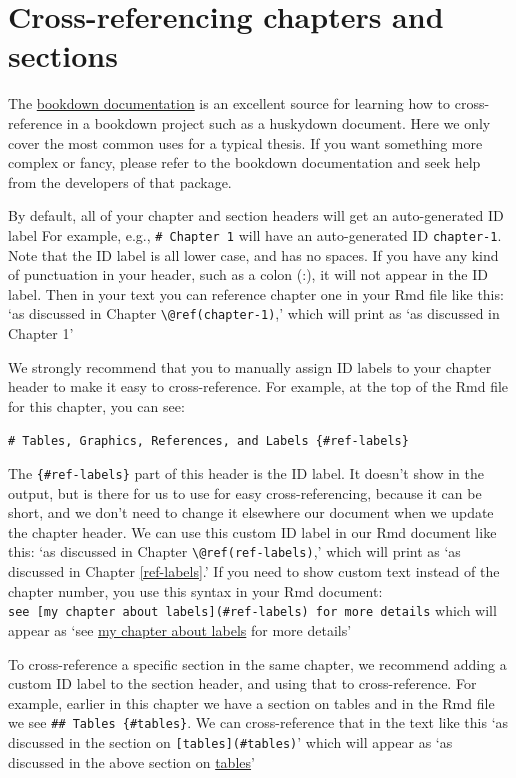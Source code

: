 \documentclass[print]{nuthesis}
\begin{document}
\hypertarget{cross-referencing-chapters-and-sections}{%
\section{Cross-referencing chapters and sections}\label{cross-referencing-chapters-and-sections}}

The \href{https://bookdown.org/yihui/bookdown/cross-references.html}{bookdown documentation} is an excellent source for learning how to cross-reference in a bookdown project such as a huskydown document. Here we only cover the most common uses for a typical thesis. If you want something more complex or fancy, please refer to the bookdown documentation and seek help from the developers of that package.

By default, all of your chapter and section headers will get an auto-generated ID label For example, e.g., \texttt{\#\ Chapter\ 1} will have an auto-generated ID \texttt{chapter-1}. Note that the ID label is all lower case, and has no spaces. If you have any kind of punctuation in your header, such as a colon (:), it will not appear in the ID label. Then in your text you can reference chapter one in your Rmd file like this: `as discussed in Chapter \texttt{\textbackslash{}@ref(chapter-1)},' which will print as `as discussed in Chapter 1'

We strongly recommend that you to manually assign ID labels to your chapter header to make it easy to cross-reference. For example, at the top of the Rmd file for this chapter, you can see:

\texttt{\#\ Tables,\ Graphics,\ References,\ and\ Labels\ \{\#ref-labels\}}

The \texttt{\{\#ref-labels\}} part of this header is the ID label. It doesn't show in the output, but is there for us to use for easy cross-referencing, because it can be short, and we don't need to change it elsewhere our document when we update the chapter header. We can use this custom ID label in our Rmd document like this: `as discussed in Chapter \texttt{\textbackslash{}@ref(ref-labels)},' which will print as `as discussed in Chapter \ref{ref-labels}.' If you need to show custom text instead of the chapter number, you use this syntax in your Rmd document: \texttt{see\ {[}my\ chapter\ about\ labels{]}(\#ref-labels)\ for\ more\ details} which will appear as `see \protect\hyperlink{ref-labels}{my chapter about labels} for more details'

To cross-reference a specific section in the same chapter, we recommend adding a custom ID label to the section header, and using that to cross-reference. For example, earlier in this chapter we have a section on tables and in the Rmd file we see \texttt{\#\#\ Tables\ \{\#tables\}}. We can cross-reference that in the text like this `as discussed in the section on \texttt{{[}tables{]}(\#tables)}' which will appear as `as discussed in the above section on \protect\hyperlink{tables}{tables}'
\end{document}
